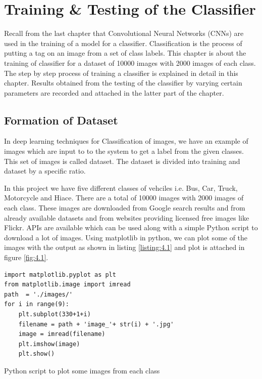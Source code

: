 \chapter{Training \& Testing of the
Classifier}
\label{Chapter 4}
Recall from the last chapter that Convolutional Neural Networks (CNNs) are used
in the training of a model for a classifier. Classification is the process
of putting a tag on an image from a set of class labels. This chapter is about the
training of classifier for a dataset of 10000 images with 2000 images of each class.
The step by step process of training a classifier is explained in detail in this chapter. Results obtained from the testing of the classifier by varying certain parameters are recorded and attached
in the latter part of the chapter.
\section{Formation of Dataset}
In deep learning techniques for Classification of images, we have
an example of images which are input to to the system to get a
label from the given classes. This set of images is called dataset.
The dataset is divided into training and dataset by a specific ratio.


In this project we have five different classes of vehciles i.e. Bus, Car, Truck, Motorcycle
and Hiace. There are a total of 10000 images with 2000 images of each 
class. These images are downloaded from Google search results and from already available
datasets and from websites providing licensed free images like Flickr. APIs are available which
can be used along with a simple Python script to download a lot of images.
Using matplotlib in python, we can plot some of the images with the output as
shown in listing \ref{listing:4.1} and plot is attached in figure
\ref{fig:4.1}.
\begin{listing}[H]
\begin{verbatim}
import matplotlib.pyplot as plt
from matplotlib.image import imread  
path  = './images/'
for i in range(9):
    plt.subplot(330+1+i)
    filename = path + 'image_'+ str(i) + '.jpg'
    image = imread(filename)
    plt.imshow(image)    
    plt.show()
\end{verbatim}
\caption{Python script to plot some images from each class}
\label{listing:4.1}
\end{listing}

